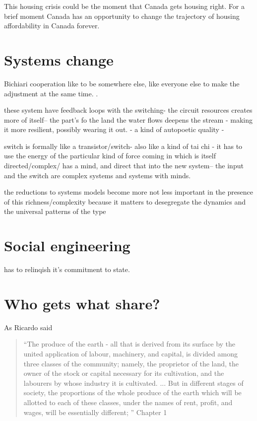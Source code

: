 This housing crisis could be the moment that Canada gets housing right. For a brief moment Canada has an opportunity to change the trajectory of housing affordability in Canada forever.


\section{Systems change}


Bichiari cooperation
like to be somewhere else, like everyone else to make the adjustment at the same time. .

these system have feedback loops with the switching- the circuit resources creates more of itself-- the part's fo the land the water flows deepens the stream - making it more resilient, possibly wearing it out. - a kind of autopoetic quality -

switch is formally like a transistor/switch- also like a kind of tai chi - it has to use the energy of the particular kind of force coming in which is itself directed/complex/ has a mind, and direct that into the new system-- the input and the switch are complex systems and systems with minds.


the reductions to systems models become more not less important in the presence of this richness/complexity because it matters to desegregate the dynamics and the universal patterns of the type


\section{Social engineering}

has to relinqish it's commitment to state. 


\section{Who gets what share?}

As Ricardo said
\begin{quotation}   
 “The produce of the earth - all that is derived from its surface by the united application of labour, machinery, and capital, is divided among three classes of the community; namely, the proprietor of the land, the owner of the stock or capital necessary for its cultivation, and the labourers by whose industry it is cultivated. ...  But in different stages of society, the proportions of the whole produce of the earth which will be allotted to each of these classes, under the names of rent, profit, and wages, will be essentially different; ”  Chapter 1
\end{quotation}

